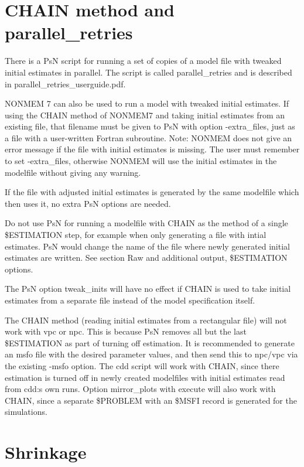 \section{CHAIN method and parallel\_retries}

There is a PsN script for running a set of copies of a model file with tweaked initial estimates in parallel. The script is called parallel\_retries and is described in parallel\_retries\_userguide.pdf.

NONMEM 7 can also be used to run a model with tweaked initial estimates. If using the CHAIN method of NONMEM7 and taking initial estimates from an existing file, that filename must be given to PsN with option -extra\_files, just as a file with a user-written Fortran subroutine. Note: NONMEM does not give an error message if the file with initial estimates is missing. The user must remember to set -extra\_files, otherwise NONMEM will use the initial estimates in the modelfile without giving any warning.

If the file with adjusted initial estimates is generated by the same modelfile which then uses it, no extra PsN options are needed.

Do not use PsN for running a modelfile with CHAIN as the method of a single \$ESTIMATION step, for example when only generating a file with intial estimates. PsN would change the name of the file where newly generated initial estimates are written. See section Raw and additional output, \$ESTIMATION options.

The PsN option tweak\_inits will have no effect if CHAIN is used to take initial estimates from a separate file instead of the model specification itself.

The CHAIN method (reading initial estimates from a rectangular file) will not work with vpc or npc. This is because PsN removes all but the last \$ESTIMATION as part of turning off estimation. It is recommended to generate an msfo file with the desired parameter values, and then send this to npc/vpc via the existing -msfo option. The cdd script will work with CHAIN, since there estimation is turned off in newly created modelfiles with initial estimates read from cdd:s own runs. Option mirror\_plots with execute will also work with CHAIN, since a separate \$PROBLEM with an \$MSFI record is generated for the simulations.

\section{Shrinkage}

